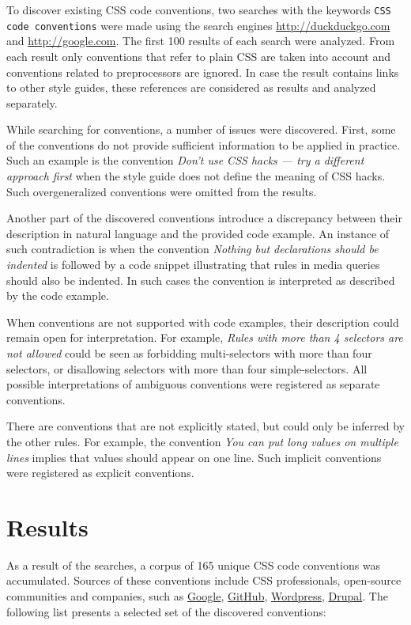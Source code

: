 \documentclass[parskip=full]{uvamscse}
\begin{document}
To discover existing CSS code conventions, two searches with the keywords \texttt{CSS code
conventions} were made using the search engines \url{http://duckduckgo.com} and
\url{http://google.com}. The first 100 results of each search were analyzed. From each result
only conventions that refer to plain CSS are taken into account and conventions related to
preprocessors are ignored. In case the result contains links to other style guides, these
references are considered as results and analyzed separately.

While searching for conventions, a number of issues were discovered. First, some of the
conventions do not provide sufficient information to be applied in practice. Such an example is the
convention \textit{Don’t use CSS hacks — try a different approach first} when the style guide does
not define the meaning of CSS hacks. Such overgeneralized conventions were omitted from the results.

Another part of the discovered conventions introduce a discrepancy between their description in
natural language and the provided code example. An instance of such contradiction is when the
convention \textit{Nothing but declarations should be indented} is followed by a code snippet
illustrating that rules in media queries should also be indented. In such cases the convention is
interpreted as described by the code example.

When conventions are not supported with code examples, their description could remain open for
interpretation. For example, \textit{Rules with more than 4 selectors are not allowed} could be seen
as forbidding multi-selectors with more than four selectors, or disallowing selectors with more than
four simple-selectors. All possible interpretations of ambiguous conventions were registered as
separate conventions.

There are conventions that are not explicitly stated, but could only be inferred by the other rules.
For example, the convention \textit{You can put long values on multiple lines} implies that values
should appear on one line. Such implicit conventions were registered as explicit conventions.

\section{Results}

As a result of the searches, a corpus of 165 unique CSS code conventions was accumulated. Sources
of these conventions include CSS professionals, open-source communities and companies, such as \href{https://google-styleguide.googlecode.com/svn/trunk/htmlcssguide.xml#Protocol}{Google}, \href{http://primercss.io/guidelines/#css}{GitHub}, \href{https://make.wordpress.org/core/handbook/best-practices/coding-standards/css/}{Wordpress}, \href{https://www.drupal.org/node/1887862}{Drupal}. The following list presents a selected set of the discovered conventions:
\end{document}
